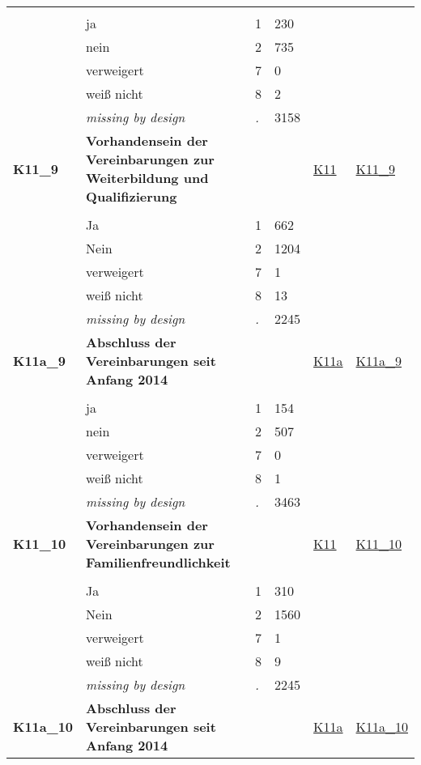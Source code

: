 \begin{longtable}{| L{2.45cm} | L{6cm} | C{1.5cm} | R{1cm} | C{2.25cm} | C{2.25cm} |}
   &  &  &  &  &  \\ 
   & ja & 1 & 230 &  &  \\ 
   & nein & 2 & 735 &  &  \\ 
   & verweigert & 7 & 0 &  &  \\ 
   & weiß nicht & 8 & 2 &  &  \\ 
   & \textit{missing by design} & \textit{.} & 3158 &  &  \\ 
   \midrule
\textbf{K11\_9}\label{var:K11:9} & \textbf{Vorhandensein der Vereinbarungen zur Weiterbildung und Qualifizierung} &  &  & \hyperref[K11]{K11} & \hyperref[var:suf:K11:9]{K11\_9} \\ 
   &  &  &  &  &  \\ 
   & Ja & 1 & 662 &  &  \\ 
   & Nein & 2 & 1204 &  &  \\ 
   & verweigert & 7 & 1 &  &  \\ 
   & weiß nicht & 8 & 13 &  &  \\ 
   & \textit{missing by design} & \textit{.} & 2245 &  &  \\ 
   \midrule
\textbf{K11a\_9}\label{var:K11a:9} & \textbf{Abschluss der Vereinbarungen seit Anfang 2014} &  &  & \hyperref[K11a]{K11a} & \hyperref[var:suf:K11a:9]{K11a\_9} \\ 
   &  &  &  &  &  \\ 
   & ja & 1 & 154 &  &  \\ 
   & nein & 2 & 507 &  &  \\ 
   & verweigert & 7 & 0 &  &  \\ 
   & weiß nicht & 8 & 1 &  &  \\ 
   & \textit{missing by design} & \textit{.} & 3463 &  &  \\ 
   \midrule
\textbf{K11\_10}\label{var:K11:10} & \textbf{Vorhandensein der Vereinbarungen zur Familienfreundlichkeit} &  &  & \hyperref[K11]{K11} & \hyperref[var:suf:K11:10]{K11\_10} \\ 
   &  &  &  &  &  \\ 
   & Ja & 1 & 310 &  &  \\ 
   & Nein & 2 & 1560 &  &  \\ 
   & verweigert & 7 & 1 &  &  \\ 
   & weiß nicht & 8 & 9 &  &  \\ 
   & \textit{missing by design} & \textit{.} & 2245 &  &  \\ 
   \midrule
\textbf{K11a\_10}\label{var:K11a:10} & \textbf{Abschluss der Vereinbarungen seit Anfang 2014} &  &  & \hyperref[K11a]{K11a} & \hyperref[var:suf:K11a:10]{K11a\_10} \\ 

\end{longtable}
